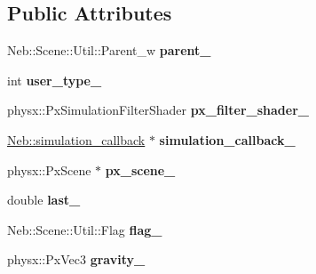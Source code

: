 \subsection*{\-Public \-Attributes}
\begin{DoxyCompactItemize}
\item 
\hypertarget{classNeb_1_1Scene_1_1Base_aff1e6fae13c98a7aea6790a698dac725}{\-Neb\-::\-Scene\-::\-Util\-::\-Parent\-\_\-w {\bfseries parent\-\_\-}}\label{classNeb_1_1Scene_1_1Base_aff1e6fae13c98a7aea6790a698dac725}

\item 
\hypertarget{classNeb_1_1Scene_1_1Base_a9565c11540a076e5aacf5cc072a1a7eb}{int {\bfseries user\-\_\-type\-\_\-}}\label{classNeb_1_1Scene_1_1Base_a9565c11540a076e5aacf5cc072a1a7eb}

\item 
\hypertarget{classNeb_1_1Scene_1_1Base_aed874c0aa2d03387a5a126cdd0fe76e6}{physx\-::\-Px\-Simulation\-Filter\-Shader {\bfseries px\-\_\-filter\-\_\-shader\-\_\-}}\label{classNeb_1_1Scene_1_1Base_aed874c0aa2d03387a5a126cdd0fe76e6}

\item 
\hypertarget{classNeb_1_1Scene_1_1Base_a234a837620e5d08bc794ae589d1b7b3a}{\hyperlink{classNeb_1_1simulation__callback}{\-Neb\-::simulation\-\_\-callback} $\ast$ {\bfseries simulation\-\_\-callback\-\_\-}}\label{classNeb_1_1Scene_1_1Base_a234a837620e5d08bc794ae589d1b7b3a}

\item 
\hypertarget{classNeb_1_1Scene_1_1Base_ac1716b66b914b8fd8e04f2de16eff4b6}{physx\-::\-Px\-Scene $\ast$ {\bfseries px\-\_\-scene\-\_\-}}\label{classNeb_1_1Scene_1_1Base_ac1716b66b914b8fd8e04f2de16eff4b6}

\item 
\hypertarget{classNeb_1_1Scene_1_1Base_a9c2b45c827982c73a5601f03085095b7}{double {\bfseries last\-\_\-}}\label{classNeb_1_1Scene_1_1Base_a9c2b45c827982c73a5601f03085095b7}

\item 
\hypertarget{classNeb_1_1Scene_1_1Base_abd3dbc52f08bdcbb304554f595009502}{\-Neb\-::\-Scene\-::\-Util\-::\-Flag {\bfseries flag\-\_\-}}\label{classNeb_1_1Scene_1_1Base_abd3dbc52f08bdcbb304554f595009502}

\item 
\hypertarget{classNeb_1_1Scene_1_1Base_aba0d8709206fb88e035507117bdb2a0d}{physx\-::\-Px\-Vec3 {\bfseries gravity\-\_\-}}\label{classNeb_1_1Scene_1_1Base_aba0d8709206fb88e035507117bdb2a0d}


\end{DoxyCompactItemize}
